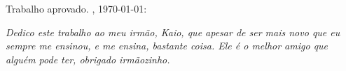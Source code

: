 \documentclass[
    12pt,				%
	oneside,            %
	a4paper,			%
	english,			%
	french,
	spanish,
	brazil				%
	]{abntex2}
\begin{document}
%
% 
%
\begin{folhadeaprovacao}

  \begin{center}
    {\ABNTEXchapterfont\large\imprimirautor}

    \vspace*{\fill}\vspace*{\fill}
    \begin{center}
      \ABNTEXchapterfont\bfseries\Large\imprimirtitulo
    \end{center}
    \vspace*{\fill}
    
    \hspace{.45\textwidth}
    \begin{minipage}{.5\textwidth}
        \imprimirpreambulo
    \end{minipage}%
    \vspace*{\fill}
   \end{center}
        
   Trabalho aprovado. \imprimirlocal, \today:

      
   \begin{center}
    \vspace*{0.5cm}
    {\imprimirlocal}
    \par
    {\imprimirdata}
    \vspace*{1cm}
  \end{center}
\end{folhadeaprovacao}

\setlength{\parskip}{0cm}  %

\begin{dedicatoria}
   \vspace*{\fill}
   \centering
   \noindent
   \textit{Dedico este trabalho ao meu irmão, Kaio, que apesar de ser mais novo que eu sempre me ensinou, e me ensina, bastante coisa. Ele é o melhor amigo que alguém pode ter, obrigado irmãozinho.} \vspace*{\fill}
\end{dedicatoria}
\end{document}
